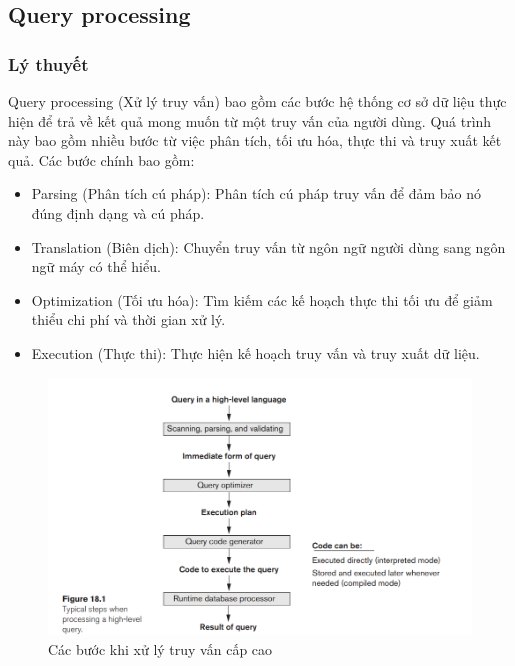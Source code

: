 \subsection{Query processing}
\subsubsection{Lý thuyết}
\indent Query processing (Xử lý truy vấn) bao gồm các bước hệ thống cơ sở dữ liệu thực hiện để trả về kết quả mong muốn từ một truy vấn của người dùng. Quá trình này bao gồm nhiều bước từ việc phân tích, tối ưu hóa, thực thi và truy xuất kết quả. Các bước chính bao gồm:
\begin{itemize}
    \item Parsing (Phân tích cú pháp): Phân tích cú pháp truy vấn để đảm bảo nó đúng định dạng và cú pháp.
    \item Translation (Biên dịch): Chuyển truy vấn từ ngôn ngữ người dùng sang ngôn ngữ máy có thể hiểu.
    \item Optimization (Tối ưu hóa): Tìm kiếm các kế hoạch thực thi tối ưu để giảm thiểu chi phí và thời gian xử lý.
    \item Execution (Thực thi): Thực hiện kế hoạch truy vấn và truy xuất dữ liệu.
\end{itemize}
\begin{figure}[H]
    \centering
    \includegraphics[width=\textwidth]{Image/2.3.1a.png}
    \caption{Các bước khi xử lý truy vấn cấp cao}
\end{figure}
